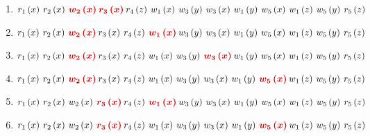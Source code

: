 \documentclass[a4paper]{article}
\begin{document}
\begin{enumerate}
		\item $r_{1}\left(x\right) \: r_{2}\left(x\right) \: \textcolor{Red3}{\boldsymbol{w_{2}\left(x\right)} \: }\textcolor{Red3}{\boldsymbol{r_{3}\left(x\right)} \: }r_{4}\left(z\right) \: w_{1}\left(x\right) \: w_{3}\left(y\right) \: w_{3}\left(x\right) \: w_{1}\left(y\right) \: w_{5}\left(x\right) \: w_{1}\left(z\right) \: w_{5}\left(y\right) \: r_{5}\left(z\right)$
		
		\item $r_{1}\left(x\right) \: r_{2}\left(x\right) \: \textcolor{Red3}{\boldsymbol{w_{2}\left(x\right)} \: }r_{3}\left(x\right) \: r_{4}\left(z\right) \: \textcolor{Red3}{\boldsymbol{w_{1}\left(x\right)} \: }w_{3}\left(y\right) \: w_{3}\left(x\right) \: w_{1}\left(y\right) \: w_{5}\left(x\right) \: w_{1}\left(z\right) \: w_{5}\left(y\right) \: r_{5}\left(z\right)$
		
		\item $r_{1}\left(x\right) \: r_{2}\left(x\right) \: \textcolor{Red3}{\boldsymbol{w_{2}\left(x\right)} \: }r_{3}\left(x\right) \: r_{4}\left(z\right) \: w_{1}\left(x\right) \: w_{3}\left(y\right) \: \textcolor{Red3}{\boldsymbol{w_{3}\left(x\right)} \: }w_{1}\left(y\right) \: w_{5}\left(x\right) \: w_{1}\left(z\right) \: w_{5}\left(y\right) \: r_{5}\left(z\right)$
		
		\item $r_{1}\left(x\right) \: r_{2}\left(x\right) \: \textcolor{Red3}{\boldsymbol{w_{2}\left(x\right)} \: }r_{3}\left(x\right) \: r_{4}\left(z\right) \: w_{1}\left(x\right) \: w_{3}\left(y\right) \: w_{3}\left(x\right) \: w_{1}\left(y\right) \: \textcolor{Red3}{\boldsymbol{w_{5}\left(x\right)} \: }w_{1}\left(z\right) \: w_{5}\left(y\right) \: r_{5}\left(z\right)$
		
		\item $r_{1}\left(x\right) \: r_{2}\left(x\right) \: w_{2}\left(x\right) \: \textcolor{Red3}{\boldsymbol{r_{3}\left(x\right)} \: }r_{4}\left(z\right) \: \textcolor{Red3}{\boldsymbol{w_{1}\left(x\right)} \: }w_{3}\left(y\right) \: w_{3}\left(x\right) \: w_{1}\left(y\right) \: w_{5}\left(x\right) \: w_{1}\left(z\right) \: w_{5}\left(y\right) \: r_{5}\left(z\right)$
		
		\item $r_{1}\left(x\right) \: r_{2}\left(x\right) \: w_{2}\left(x\right) \: \textcolor{Red3}{\boldsymbol{r_{3}\left(x\right)} \: }r_{4}\left(z\right) \: w_{1}\left(x\right) \: w_{3}\left(y\right) \: w_{3}\left(x\right) \: w_{1}\left(y\right) \: \textcolor{Red3}{\boldsymbol{w_{5}\left(x\right)} \: }w_{1}\left(z\right) \: w_{5}\left(y\right) \: r_{5}\left(z\right)$
		

\end{enumerate}
\end{document}
